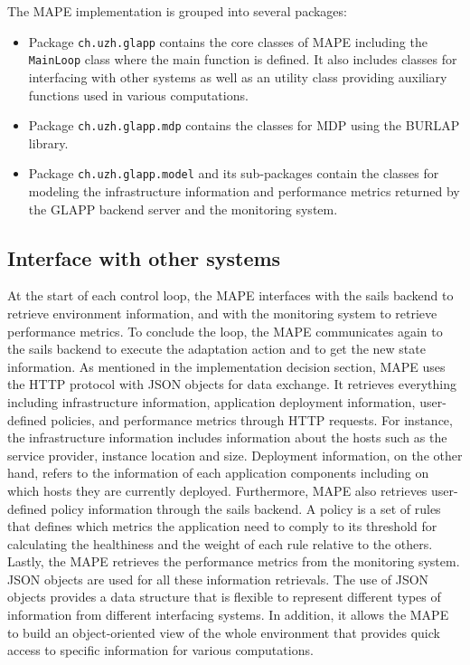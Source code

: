 \documentclass{seal_thesis}
\begin{document}
The MAPE implementation is grouped into several packages:
\begin{itemize}
\item Package \texttt{ch.uzh.glapp} contains the core classes of MAPE including the \texttt{MainLoop} class where the main function is defined.
It also includes classes for interfacing with other systems as well as an utility class providing auxiliary functions used in various computations. 
\item Package \texttt{ch.uzh.glapp.mdp} contains the classes for MDP using the BURLAP library.
\item Package \texttt{ch.uzh.glapp.model} and its sub-packages contain the classes for modeling the infrastructure information and performance metrics returned by the GLAPP backend server and the monitoring system.
\end{itemize}

\subsection{Interface with other systems}
At the start of each control loop, the MAPE interfaces with the sails backend to retrieve environment information, and with the monitoring system to retrieve performance metrics.
To conclude the loop, the MAPE communicates again to the sails backend to execute the adaptation action and to get the new state information.
As mentioned in the implementation decision section, MAPE uses the HTTP protocol with JSON objects for data exchange.
It retrieves everything including infrastructure information, application deployment information, user-defined policies, and performance metrics through HTTP requests.
For instance, the infrastructure information includes information about the hosts such as the service provider, instance location and size.
Deployment information, on the other hand, refers to the information of each application components including on which hosts they are currently deployed.
Furthermore, MAPE also retrieves user-defined policy information through the sails backend.
A policy is a set of rules that defines which metrics the application need to comply to its threshold for calculating the healthiness and the weight of each rule relative to the others.
Lastly, the MAPE retrieves the performance metrics from the monitoring system.
JSON objects are used for all these information retrievals.
The use of JSON objects provides a data structure that is flexible to represent different types of information from different interfacing systems.
In addition, it allows the MAPE to build an object-oriented view of the whole environment that provides quick access to specific information for various computations.
\end{document}
